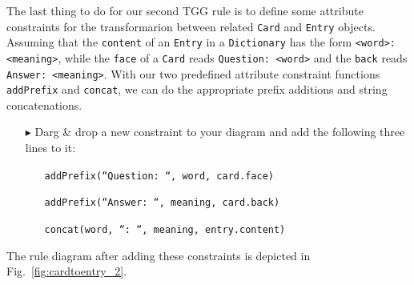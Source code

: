 The last thing to do for our second TGG rule is to define some attribute constraints for the transformarion between related \texttt{Card} and \texttt{Entry} objects.
Assuming that the \texttt{content} of an \texttt{Entry} in a \texttt{Dictionary} has the form \texttt{<word>: <meaning>}, while the \texttt{face} of a \texttt{Card} reads \texttt{Question: <word>} and the \texttt{back} reads \texttt{Answer: <meaning>}.
With our two predefined attribute constraint functions \texttt{addPrefix} and \texttt{concat}, we can do the appropriate prefix additions and string concatenations.

\begin{enumerate}
\item[$\blacktriangleright$] Darg \& drop a new constraint to your diagram and add the following three lines to it:

\begin{itemize}
\item[] \texttt{addPrefix(``Question: ``, word, card.face)} 
\item[] \texttt{addPrefix(``Answer: ``, meaning, card.back)} 
\item[] \texttt{concat(word, ``: ``, meaning, entry.content)} 
\end{itemize}

\end{enumerate}

The rule diagram after adding these constraints is depicted in Fig.~\ref{fig:cardtoentry_2}.

